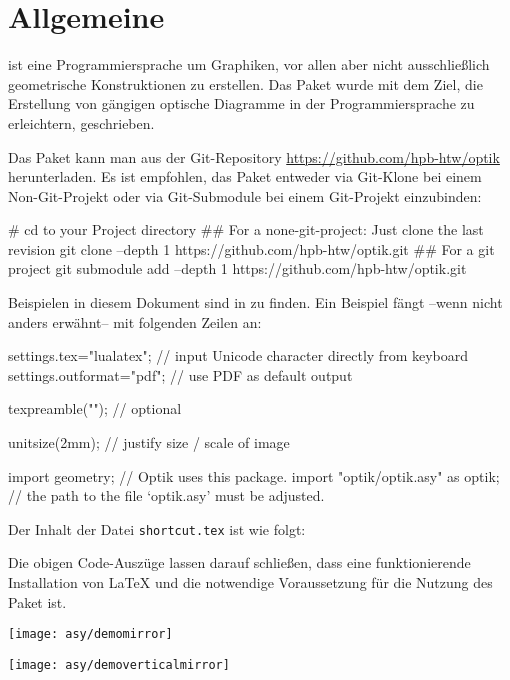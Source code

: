 \chapter{Allgemeine}

\asypmtote\cite{Asymptote} ist eine Programmiersprache um Graphiken, vor allen aber nicht ausschließlich geometrische Konstruktionen zu erstellen.
Das Paket \optik{} wurde mit dem Ziel, die Erstellung von gängigen optische Diagramme in der Programmiersprache \asypmtote{} zu erleichtern, geschrieben.

Das Paket kann man aus der Git-Repository \url{https://github.com/hpb-htw/optik} herunterladen.
Es ist empfohlen, das Paket entweder via Git-Klone bei einem Non-Git-Projekt oder via Git-Submodule bei einem Git-Projekt einzubinden:

\begin{shellcode}
#  cd to your Project directory
## For a none-git-project: Just clone the last revision
git clone --depth 1 https://github.com/hpb-htw/optik.git
## For a git project
git submodule add --depth 1 https://github.com/hpb-htw/optik.git
\end{shellcode}

Beispielen in diesem Dokument sind in \repo{} zu finden. 
Ein Beispiel fängt --wenn nicht anders erwähnt-- mit folgenden Zeilen an:

\begin{asycode}
settings.tex="lualatex";  // input Unicode character directly from keyboard
settings.outformat="pdf"; // use PDF as default output

texpreamble(""); // optional

unitsize(2mm);                       // justify size / scale of image

import geometry;                     // Optik uses this package.
import "optik/optik.asy" as optik;   // the path to the file `optik.asy' must be adjusted.
\end{asycode}


Der Inhalt der Datei \verb|shortcut.tex| ist wie folgt:

\begin{texcode}
\newcommand{\pLabel}[1]{\mathsf{#1}}
\newcommand{\tLabel}[1]{\textsf{#1}}
\end{texcode}


Die obigen Code-Auszüge lassen darauf schließen, 
dass eine funktionierende Installation von \LaTeX{} und \asypmtote{} die notwendige Voraussetzung für die Nutzung des Paket \optik{} ist.



\texttt{[image: asy/demomirror]}

\texttt{[image: asy/demoverticalmirror]}


